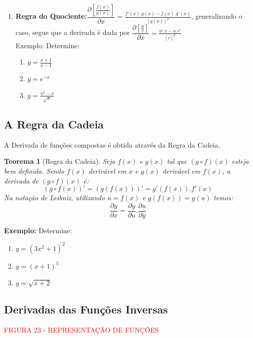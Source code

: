 \documentclass[oneside,a4paper,12pt]{article}
\newtheorem{theorem}{Teorema}[section]
\begin{document}
\begin{enumerate}
	\item {\bf Regra do Quociente:}$\dfrac{\partial [\frac{f(x)}{g(x)}]}{\partial x} = \frac{f'(x).g(x) - f(x).g'(x)}{[g(x)]^2}$, generalizando o caso, segue que a derivada é dada por $\dfrac{\partial [\frac{u}{v}]}{\partial x} = \frac{u'.v-u.v'}{[v]^2}$
	\\ Exemplo: Determine: \begin{enumerate}
		\item $y=\frac{x+1}{x-1}$
		\item $y=e^{-x}$
		\item $y=\frac{x^2 - x}{\sqrt{x}}$
		\vspace{230pt}
	\end{enumerate}
\end{enumerate}

\subsection{A Regra da Cadeia}
A Derivada de funções compostas é obtida através da Regra da Cadeia.

\begin{theorem}[Regra da Cadeia]
	Seja $f(x)$ e $g(x)$ tal que $(g \circ f)(x)$ esteja bem definida. Sendo $f(x)$ derivável em $x$ e $g(x)$ derivável em $f(x)$, a derivada de $(g \circ f)(x)$ é:
	\begin{equation}
	(g \circ f(x))' = (g(f(x)))' = g'(f(x)).f'(x)
	\end{equation}
	Na notação de Leibniz, utilizando $u = f(x)$ e $g(f(x))=g(u)$ temos:
	\begin{equation}
	\dfrac{\partial y}{\partial x} = \dfrac{\partial y}{\partial u} . \dfrac{\partial u}{\partial y}
	\end{equation}
\end{theorem}

	{\bf Exemplo:} Determine:
	\begin{enumerate}
		\item $y=(3x^2 + 1)^2$
		\item $y=(x+1)^5$
		\item $y=\sqrt{x+2}$
		\vspace{200pt}
	\end{enumerate}


\subsection{Derivadas das Funções Inversas}
	
\vspace{220pt}
\begin{center}
	\textcolor{red}{FIGURA 23 - REPRESENTAÇÃO DE FUNÇÕES}
\end{center}
\end{document}
